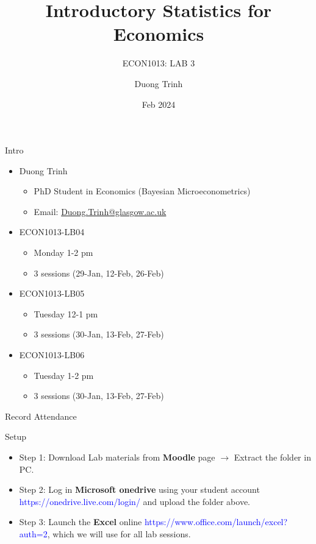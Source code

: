 \documentclass[
  10pt,
  ignorenonframetext,
]{beamer}
\title{Introductory Statistics for Economics}
\subtitle{ECON1013: LAB 3}
\author{Duong Trinh}
\date{Feb 2024}
\institute{University of Glasgow}
\providecommand{\tightlist}{%
  \setlength{\itemsep}{0pt}\setlength{\parskip}{0pt}}
\begin{document}
\frame{\titlepage}

\begin{frame}{Intro}
\protect\hypertarget{intro}{}
\begin{itemize}
\tightlist
\item
  Duong Trinh

  \begin{itemize}
  \tightlist
  \item
    PhD Student in Economics (Bayesian Microeconometrics)
  \item
    Email: \underline{Duong.Trinh@glasgow.ac.uk}
  \end{itemize}
\end{itemize}

\vspace{3mm}

\begin{itemize}
\tightlist
\item
  ECON1013-LB04

  \begin{itemize}
  \tightlist
  \item
    Monday 1-2 pm
  \item
    3 sessions (29-Jan, 12-Feb, 26-Feb)
  \end{itemize}
\item
  ECON1013-LB05

  \begin{itemize}
  \tightlist
  \item
    Tuesday 12-1 pm
  \item
    3 sessions (30-Jan, 13-Feb, 27-Feb)
  \end{itemize}
\item
  ECON1013-LB06

  \begin{itemize}
  \tightlist
  \item
    Tuesday 1-2 pm
  \item
    3 sessions (30-Jan, 13-Feb, 27-Feb)
  \end{itemize}
\end{itemize}

\vspace{3mm}
\end{frame}

\begin{frame}{Record Attendance}
\protect\hypertarget{record-attendance}{}
\end{frame}

\begin{frame}{Setup}
\protect\hypertarget{setup}{}
\begin{itemize}
\item
  Step 1: Download Lab materials from \textbf{Moodle} page
  \(\rightarrow\) Extract the folder in PC.
\item
  Step 2: Log in \textbf{Microsoft onedrive} using your student account
  \textcolor{blue}{https://onedrive.live.com/login/} and upload the
  folder above.
\item
  Step 3: Launch the \textbf{Excel} online
  \textcolor{blue}{https://www.office.com/launch/excel?auth=2}, which we
  will use for all lab sessions.
\end{itemize}
\end{frame}
\end{document}
